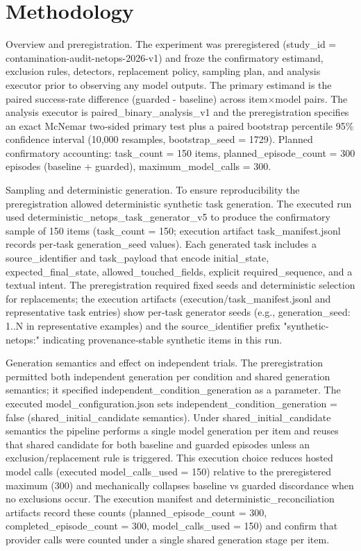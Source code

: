 \documentclass[conference]{IEEEtran}
\begin{document}
\section{Methodology}
Overview and preregistration. The experiment was preregistered (study\_id = contamination-audit-netops-2026-v1) and froze the confirmatory estimand, exclusion rules, detectors, replacement policy, sampling plan, and analysis executor prior to observing any model outputs. The primary estimand is the paired success‑rate difference (guarded - baseline) across item\ensuremath{\times}model pairs. The analysis executor is paired\_binary\_analysis\_v1 and the preregistration specifies an exact McNemar two‑sided primary test plus a paired bootstrap percentile 95\% confidence interval (10,000 resamples, bootstrap\_seed = 1729). Planned confirmatory accounting: task\_count = 150 items, planned\_episode\_count = 300 episodes (baseline + guarded), maximum\_model\_calls = 300.

Sampling and deterministic generation. To ensure reproducibility the preregistration allowed deterministic synthetic task generation. The executed run used deterministic\_netops\_task\_generator\_v5 to produce the confirmatory sample of 150 items (task\_count = 150; execution artifact task\_manifest.jsonl records per‑task generation\_seed values). Each generated task includes a source\_identifier and task\_payload that encode initial\_state, expected\_final\_state, allowed\_touched\_fields, explicit required\_sequence, and a textual intent. The preregistration required fixed seeds and deterministic selection for replacements; the execution artifacts (execution/task\_manifest.jsonl and representative task entries) show per‑task generator seeds (e.g., generation\_seed: 1..N in representative examples) and the source\_identifier prefix "synthetic-netops:" indicating provenance‑stable synthetic items in this run.

Generation semantics and effect on independent trials. The preregistration permitted both independent generation per condition and shared generation semantics; it specified independent\_condition\_generation as a parameter. The executed model\_configuration.json sets independent\_condition\_generation = false (shared\_initial\_candidate semantics). Under shared\_initial\_candidate semantics the pipeline performs a single model generation per item and reuses that shared candidate for both baseline and guarded episodes unless an exclusion/replacement rule is triggered. This execution choice reduces hosted model calls (executed model\_calls\_used = 150) relative to the preregistered maximum (300) and mechanically collapses baseline vs guarded discordance when no exclusions occur. The execution manifest and deterministic\_reconciliation artifacts record these counts (planned\_episode\_count = 300, completed\_episode\_count = 300, model\_calls\_used = 150) and confirm that provider calls were counted under a single shared generation stage per item.
\end{document}
